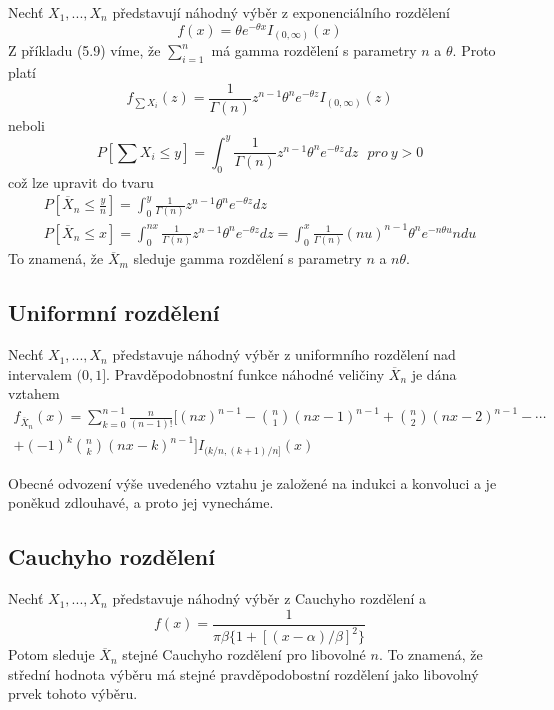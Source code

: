 Nechť $X_1, ..., X_n$ představují náhodný výběr z exponenciálního rozdělení
\begin{equation*}
f(x) = \theta e^{-\theta x}I_{(0, \infty)}(x)
\end{equation*}
Z příkladu (5.9) víme, že $\sum_{i = 1}^n$ má gamma rozdělení s parametry $n$ a $\theta$. Proto platí
\begin{equation*}
f_{\sum X_i}(z) = \frac{1}{\Gamma(n)}z^{n - 1} \theta^n e^{-\theta z} I_{(0, \infty)}(z)
\end{equation*}
neboli
\begin{equation*}
P[\sum X_i \le y] = \int_0^y \frac{1}{\Gamma(n)}z^{n - 1} \theta^n e^{- \theta z}dz ~~~ \textit{pro}~ y > 0
\end{equation*}
což lze upravit do tvaru
\begin{gather*}
P \left[\overline{X}_n \le \frac{y}{n} \right] = \int_0^y \frac{1}{\Gamma(n)}z^{n - 1} \theta^n e^{- \theta z} dz\\
P[\overline{X}_n \le x] = \int_0^{nx} \frac{1}{ \Gamma(n)}z^{n - 1} \theta^n e^{-\theta z} dz = \int_0^x \frac{1}{\Gamma(n)}(nu)^{n-1}\theta^n e^{-n \theta u}n du
\end{gather*}
To znamená, že $\overline{X}_m$ sleduje gamma rozdělení s parametry $n$ a $n \theta$.

\subsection{Uniformní rozdělení}

Nechť $X_1, ..., X_n$ představuje náhodný výběr z uniformního rozdělení nad intervalem $(0, 1]$. Pravděpodobnostní funkce náhodné veličiny $\overline{X}_n$ je dána vztahem
\begin{gather*}
f_{\overline{X}_n}(x) = \sum_{k = 0}^{n - 1} \frac{n}{(n - 1)!} \Big[(nx)^{n - 1} - \binom{n}{1}(nx - 1)^{n - 1} + \binom{n}{2}(nx - 2)^{n - 1} - \cdots \\
+ (-1)^k \binom{n}{k}(nx - k)^{n - 1} \Big]I_{(k/n, (k + 1)/n]}(x)
\end{gather*}

Obecné odvození výše uvedeného vztahu je založené na indukci a konvoluci a je poněkud zdlouhavé, a proto jej vynecháme.

\subsection{Cauchyho rozdělení}

Nechť $X_1, ..., X_n$ představuje náhodný výběr z Cauchyho rozdělení a
\begin{equation*}
f(x) = \frac{1}{\pi \beta \{1 + [(x - \alpha)/\beta]^2\}}
\end{equation*}
Potom sleduje $\overline{X}_n$ stejné Cauchyho rozdělení pro libovolné $n$. To znamená, že střední hodnota výběru má stejné pravděpodobostní rozdělení jako libovolný prvek tohoto výběru.

